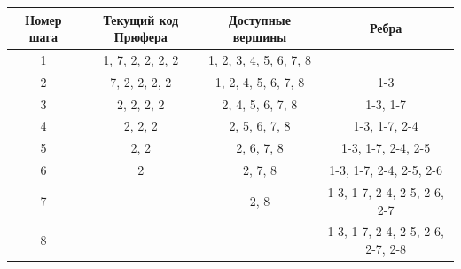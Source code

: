 \documentclass{article}
\begin{document}
\begin{enumerate}
    \begin{table}[h]
        \centering
        \begin{tabular}{|c|c|c|c|}
            \hline
            Номер шага & Текущий код Прюфера & Доступные вершины & Ребра \\
            \hline
            1 & 1, 7, 2, 2, 2, 2 & 1, 2, 3, 4, 5, 6, 7, 8 & \\
            \hline
            2 & 7, 2, 2, 2, 2 & 1, 2, 4, 5, 6, 7, 8 & 1-3 \\
            \hline
            3 & 2, 2, 2, 2 & 2, 4, 5, 6, 7, 8 & 1-3, 1-7 \\
            \hline
            4 & 2, 2, 2 & 2, 5, 6, 7, 8 & 1-3, 1-7, 2-4 \\
            \hline
            5 & 2, 2 & 2, 6, 7, 8 & 1-3, 1-7, 2-4, 2-5 \\
            \hline
            6 & 2 & 2, 7, 8 & 1-3, 1-7, 2-4, 2-5, 2-6 \\
            \hline
            7 & & 2, 8 & 1-3, 1-7, 2-4, 2-5, 2-6, 2-7 \\
            \hline
            8 & & & 1-3, 1-7, 2-4, 2-5, 2-6, 2-7, 2-8 \\
            \hline
        \end{tabular}
    \end{table}

\end{enumerate}
\end{document}
